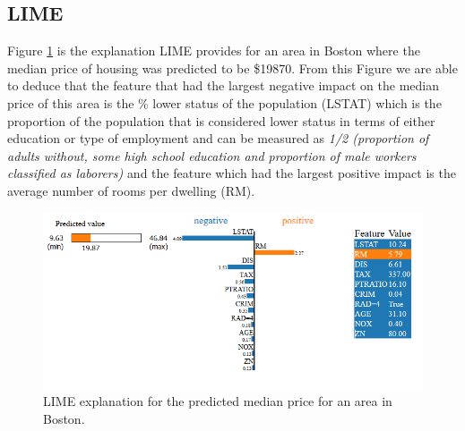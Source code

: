 \subsection{LIME}
Figure \ref{fig:lime-house} is the explanation LIME provides for an area in Boston where the median price of housing was predicted to be \$19870. From this Figure we are able to deduce that the feature that had the largest negative impact on the median price of this area is the \% lower status of the population (LSTAT) which is the proportion of the population that is considered lower status in terms of either education or type of employment and can be measured as \emph{1/2 (proportion of adults without, some high school education and proportion of male workers classified as laborers)} \cite{HARRISON197881} and the feature which had the largest positive impact is the average number of rooms per dwelling (RM).
\begin  {figure}[!htpb]
  \includegraphics[width=\linewidth]{Evaluation_Images/House_LIME.png}
  \caption{LIME explanation for the predicted median price for an area in Boston.}
  \label{fig:lime-house}
\end{figure}

